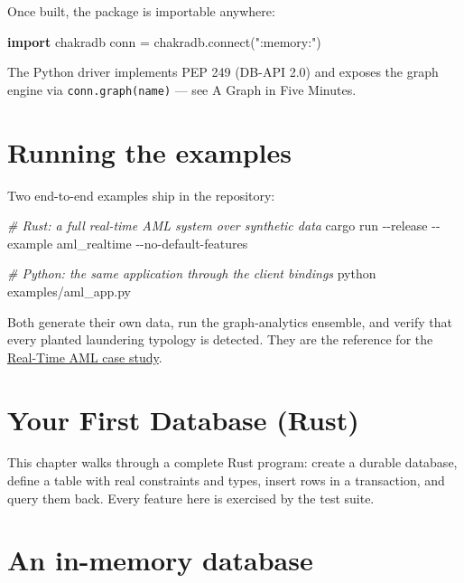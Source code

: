 \documentclass[
  11pt,
  openany]{book}
\newenvironment{Shaded}{}{}
\newcommand{\AttributeTok}[1]{\textcolor[rgb]{0.49,0.56,0.16}{#1}}
\newcommand{\CommentTok}[1]{\textcolor[rgb]{0.38,0.63,0.69}{\textit{#1}}}
\newcommand{\ExtensionTok}[1]{#1}
\newcommand{\ImportTok}[1]{\textcolor[rgb]{0.00,0.50,0.00}{\textbf{#1}}}
\newcommand{\NormalTok}[1]{#1}
\newcommand{\OperatorTok}[1]{\textcolor[rgb]{0.40,0.40,0.40}{#1}}
\newcommand{\StringTok}[1]{\textcolor[rgb]{0.25,0.44,0.63}{#1}}
\begin{document}
Once built, the package is importable anywhere:

\begin{Shaded}
\begin{Highlighting}[]
\ImportTok{import}\NormalTok{ chakradb}
\NormalTok{conn }\OperatorTok{=}\NormalTok{ chakradb.}\ExtensionTok{connect}\NormalTok{(}\StringTok{":memory:"}\NormalTok{)}
\end{Highlighting}
\end{Shaded}

The Python driver implements PEP 249 (DB-API 2.0) and exposes the graph
engine via \texttt{conn.graph(name)} --- see A Graph in Five Minutes.

\section{Running the examples}\label{running-the-examples}

Two end-to-end examples ship in the repository:

\begin{Shaded}
\begin{Highlighting}[]
\CommentTok{\# Rust: a full real{-}time AML system over synthetic data}
\ExtensionTok{cargo}\NormalTok{ run }\AttributeTok{{-}{-}release} \AttributeTok{{-}{-}example}\NormalTok{ aml\_realtime }\AttributeTok{{-}{-}no{-}default{-}features}

\CommentTok{\# Python: the same application through the client bindings}
\ExtensionTok{python}\NormalTok{ examples/aml\_app.py}
\end{Highlighting}
\end{Shaded}

Both generate their own data, run the graph-analytics ensemble, and
verify that every planted laundering typology is detected. They are the
reference for the \href{../case-studies/aml.md}{Real-Time AML case
study}.

\section{Your First Database (Rust)}\label{your-first-database-rust}

This chapter walks through a complete Rust program: create a durable
database, define a table with real constraints and types, insert rows in
a transaction, and query them back. Every feature here is exercised by
the test suite.

\section{An in-memory database}\label{an-in-memory-database}
\end{document}
